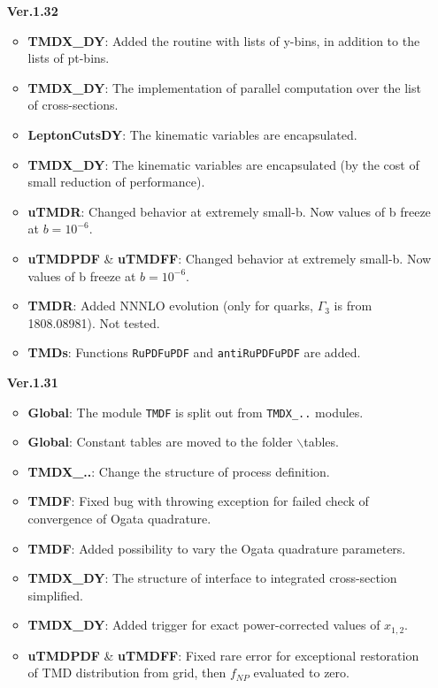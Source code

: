 \documentclass[prd,nofootinbib,eqsecnum,final]{revtex4}
\renewcommand{\(}{\left(}
\renewcommand{\)}{\right)}
\renewcommand{\[}{\left[}
\renewcommand{\]}{\right]}
\begin{document}
\begin{itemize}
\item[\textbf{Ver.1.32}]
\begin{itemize}
\item \textbf{TMDX{\_}DY}: Added the routine with lists of y-bins, in addition to the lists of pt-bins.
\item \textbf{TMDX{\_}DY}: The implementation of parallel computation over the list of cross-sections.
\item \textbf{LeptonCutsDY}: The kinematic variables are encapsulated.
\item \textbf{TMDX{\_}DY}: The kinematic variables are encapsulated (by the cost of small reduction of performance).
\item \textbf{uTMDR}: Changed behavior at extremely small-b. Now values of b freeze at $b=10^{-6}$.
\item \textbf{uTMDPDF} \& \textbf{uTMDFF}: Changed behavior at extremely small-b. Now values of b freeze at $b=10^{-6}$.
\item \textbf{TMDR}: Added NNNLO evolution (only for quarks, $\Gamma_3$ is from 1808.08981). Not tested.
\item \textbf{TMDs}: Functions \texttt{RuPDFuPDF} and \texttt{antiRuPDFuPDF} are added.
\end{itemize}

\item[\textbf{Ver.1.31}]
\begin{itemize}
\item \textbf{Global}: The module \texttt{TMDF} is split out from \texttt{TMDX{\_}..} modules.
\item \textbf{Global}: Constant tables are moved to the folder $\backslash$tables.
\item \textbf{TMDX{\_}..}: Change the structure of process definition.
\item \textbf{TMDF}: Fixed bug with throwing exception for failed check of convergence of Ogata quadrature.
\item \textbf{TMDF}: Added possibility to vary the Ogata quadrature parameters.
\item \textbf{TMDX{\_}DY}: The structure of interface to integrated cross-section simplified.
\item \textbf{TMDX{\_}DY}: Added trigger for exact power-corrected values of $x_{1,2}$.
\item \textbf{uTMDPDF} \& \textbf{uTMDFF}: Fixed rare error for exceptional restoration of TMD distribution from grid, then $f_{NP}$ evaluated to zero.
\end{itemize}


\end{itemize}
\end{document}
